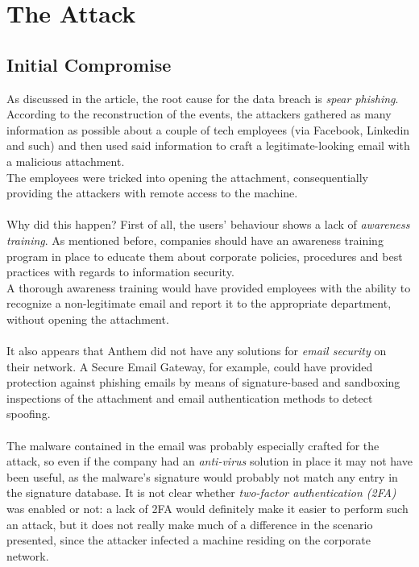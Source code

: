 \section{The Attack}
	\subsection{Initial Compromise}
	As discussed in the article, the root cause for the data breach is \textit{spear phishing}. According to the reconstruction of the events, the attackers gathered as many information as possible about a couple of tech employees (via Facebook, Linkedin and such) and then used said information to craft a legitimate-looking email with a malicious attachment. \\
	The employees were tricked into opening the attachment, consequentially providing the attackers with remote access to the machine.\\\\
	Why did this happen? First of all, the users' behaviour shows a lack of \textit{awareness training}. As mentioned before, companies should have an awareness training program in place to educate them about corporate policies, procedures and best practices with regards to information security.\\
	A thorough awareness training would have provided employees with the ability to recognize a non-legitimate email and report it to the appropriate department, without opening the attachment.\\\\
	It also appears that Anthem did not have any solutions for \textit{email security} on their network. A Secure Email Gateway, for example, could have provided protection against phishing emails by means of signature-based and sandboxing inspections of the attachment and email authentication methods to detect spoofing.\\\\
	The malware contained in the email was probably especially crafted for the attack, so even if the company had an \textit{anti-virus} solution in place it may not have been useful, as the malware's signature would probably not match any entry in the signature database. It is not clear whether \textit{two-factor authentication (2FA)} was enabled or not: a lack of 2FA would definitely make it easier to perform such an attack, but it does not really make much of a difference in the scenario presented, since the attacker infected a machine residing on the corporate network.

